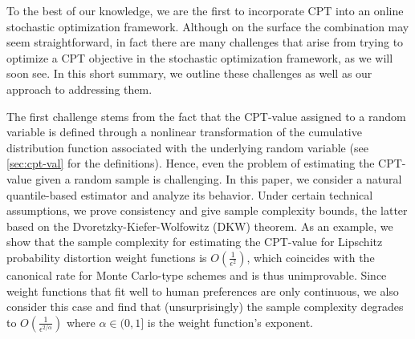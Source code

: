 To the  best of our knowledge, we are the first to incorporate CPT into an online stochastic optimization framework. Although on the surface the combination may seem straightforward, in fact there are many challenges that arise from trying to optimize a CPT objective in the stochastic optimization framework, as we will soon see. 
In this short summary, we outline these challenges as well as our approach to addressing them. 

The first challenge stems from the fact that the CPT-value assigned to a random variable is defined through a nonlinear transformation of the cumulative distribution function associated with the underlying random variable (see \cref{sec:cpt-val} for the definitions). 
Hence, even the problem of estimating the CPT-value given a random sample is challenging.
In this paper, we consider a natural quantile-based estimator and analyze its behavior.
Under certain technical assumptions, we prove consistency and give sample complexity bounds, the latter based on the
 Dvoretzky-Kiefer-Wolfowitz (DKW) theorem.
As an example, we show that the sample complexity for estimating the CPT-value 
for Lipschitz probability distortion weight functions is  $O\left(\frac1{\epsilon^2}\right)$, which coincides with the canonical rate for Monte Carlo-type schemes and is thus unimprovable. Since weight functions that fit well to human preferences are only  \holder continuous, we also consider this case and find that (unsurprisingly) the sample complexity  degrades to $O\left(\frac1{\epsilon^{2/\alpha}}\right)$ where $\alpha\in (0,1]$ is the weight function's \holder exponent.

